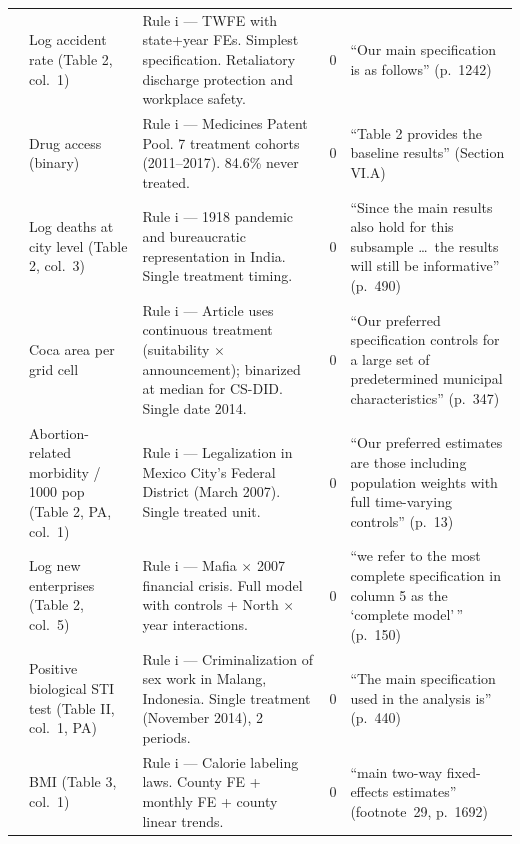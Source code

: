 \begin{small}
\begin{longtable}{p{2.2cm} p{3.0cm} p{5.5cm} p{0.8cm} p{4cm}}
\textcite{johnson2024legal}
& Log accident rate (Table 2, col.~1)
& Rule i --- TWFE with state+year FEs. Simplest specification. Retaliatory discharge protection and workplace safety.
& 0
& ``Our main specification is as follows'' (p.~1242) \\

\textcite{galasso2024licensing}
& Drug access (binary)
& Rule i --- Medicines Patent Pool. 7 treatment cohorts (2011--2017). 84.6\% never treated.
& 0
& ``Table 2 provides the baseline results'' (Section VI.A) \\

\textcite{xu2023bureaucratic}
& Log deaths at city level (Table 2, col.~3)
& Rule i --- 1918 pandemic and bureaucratic representation in India. Single treatment timing.
& 0
& ``Since the main results also hold for this subsample \ldots\ the results will still be informative'' (p.~490) \\

\textcite{prem2023rise}
& Coca area per grid cell
& Rule i --- Article uses continuous treatment (suitability $\times$ announcement); binarized at median for CS-DID. Single date 2014.
& 0
& ``Our preferred specification controls for a large set of predetermined municipal characteristics'' (p.~347) \\

\textcite{clarke2021abortion}
& Abortion-related morbidity / 1000 pop (Table 2, PA, col.~1)
& Rule i --- Legalization in Mexico City's Federal District (March 2007). Single treated unit.
& 0
& ``Our preferred estimates are those including population weights with full time-varying controls'' (p.~13) \\

\textcite{lemoglie2022mafia}
& Log new enterprises (Table 2, col.~5)
& Rule i --- Mafia $\times$ 2007 financial crisis. Full model with controls + North $\times$ year interactions.
& 0
& ``we refer to the most complete specification in column 5 as the `complete model'\,'' (p.~150) \\

\textcite{cameron2021crimes}
& Positive biological STI test (Table II, col.~1, PA)
& Rule i --- Criminalization of sex work in Malang, Indonesia. Single treatment (November 2014), 2 periods.
& 0
& ``The main specification used in the analysis is'' (p.~440) \\

\textcite{courtemanche2025calorie}
& BMI (Table 3, col.~1)
& Rule i --- Calorie labeling laws. County FE + monthly FE + county linear trends.
& 0
& ``main two-way fixed-effects estimates'' (footnote~29, p.~1692) \\


\end{longtable}
\end{small}
